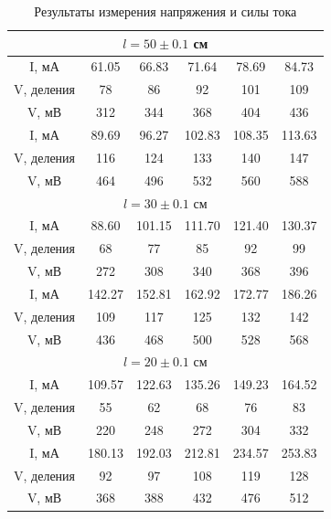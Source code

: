 \documentclass[a4paper,12pt]{article}
\begin{document}
\begin{table}[H]
\caption{Результаты измерения напряжения и силы тока}
\begin{tabular}{|c|c|c|c|c|c|}
\hline
   \multicolumn{6}{|c|}{$l = 50 \pm 0.1$ см}\\
\hline
I, мА & 61.05 & 66.83 & 71.64 & 78.69 & 84.73\\
\hline
V, деления & 78 & 86 & 92 & 101 & 109\\
\hline
V, мВ & 312 & 344 & 368 & 404 & 436\\
\hline

I, мА & 89.69 & 96.27 & 102.83 & 108.35 & 113.63\\
\hline
V, деления & 116 & 124 & 133 & 140 & 147\\
\hline
V, мВ & 464 & 496 & 532 & 560 & 588\\
\hline
\hline

   \multicolumn{6}{|c|}{$l = 30 \pm 0.1$ см} \\
\hline
I, мА & 88.60 & 101.15 & 111.70 & 121.40 & 130.37 \\
\hline
V, деления & 68 & 77 & 85 & 92 & 99 \\
\hline
V, мВ & 272 & 308 & 340 & 368 & 396 \\
\hline

I, мА & 142.27 & 152.81 & 162.92 & 172.77 & 186.26  \\
\hline
V, деления & 109 & 117 & 125 & 132 & 142 \\
\hline
V, мВ & 436 & 468 & 500 & 528 & 568 \\
\hline
\hline

   \multicolumn{6}{|c|}{$l = 20 \pm 0.1$ см} \\
I, мА & 109.57 & 122.63 & 135.26 & 149.23 & 164.52  \\
\hline
V, деления & 55 & 62 & 68 & 76 & 83 \\
\hline
V, мВ & 220 & 248 & 272 & 304 & 332 \\
\hline

I, мА & 180.13 & 192.03 & 212.81 & 234.57 & 253.83 \\
\hline
V, деления & 92 & 97 & 108 & 119 & 128 \\
\hline
V, мВ & 368 & 388 & 432 & 476 & 512  \\
\hline

\end{tabular}
\label{ампвол}
\end{table}
\end{document}
